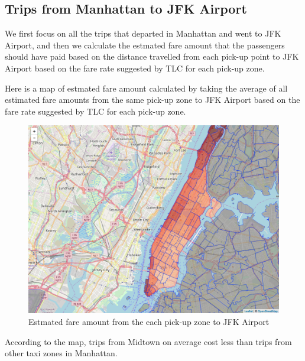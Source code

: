 \documentclass[12pt,twoside]{reedthesis}
\theoremstyle{definition}
\theoremstyle{definition}
\theoremstyle{definition}
\theoremstyle{remark}
\begin{document}
\subsection{Trips from Manhattan to JFK
Airport}\label{trips-from-manhattan-to-jfk-airport}

We first focus on all the trips that departed in Manhattan and went to
JFK Airport, and then we calculate the estmated fare amount that the
passengers should have paid based on the distance travelled from each
pick-up point to JFK Airport based on the fare rate suggested by TLC for
each pick-up zone.

Here is a map of estmated fare amount calculated by taking the average
of all estimated fare amounts from the same pick-up zone to JFK Airport
based on the fare rate suggested by TLC for each pick-up zone.
\begin{figure}

{\centering \includegraphics[width=4.96in]{figure/to_jkf_fare_vis} 

}

\caption{Estmated fare amount from the each pick-up zone to JFK Airport}\label{fig:to-jkf-fare-vis}
\end{figure}
According to the map, trips from Midtown on average cost less than trips
from other taxi zones in Manhattan.
\end{document}
